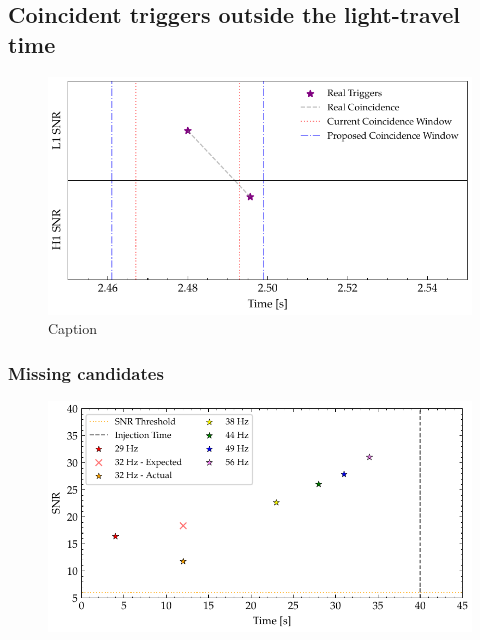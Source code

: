



\subsection{\label{6:sec:outside-coinc-window}Coincident triggers outside the light-travel time}
%
\begin{figure}
    \centering
    \includegraphics[width=\textwidth]{images/6_earlywarning/identified-problems/outside_coinc_window.pdf}
    \caption{Caption}
    \label{6:fig:outside_coinc_window}
\end{figure}
%


\subsubsection{\label{6:sec:missing-cands}Missing candidates}
%
\begin{figure}
       \centering
    \includegraphics[width=\textwidth]{images/6_earlywarning/identified-problems/non_mono_snr.pdf}
    \caption{}
    \label{6:fig:non-monotonic-snr}
\end{figure}
%

